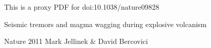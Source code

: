 \documentclass[letterpaper]{article}
\begin{document}
 
This is a proxy PDF for doi:10.1038/nature09828

Seismic tremors and magma wagging during explosive volcanism

Nature 2011
Mark Jellinek \& David Bercovici
\end{document}
